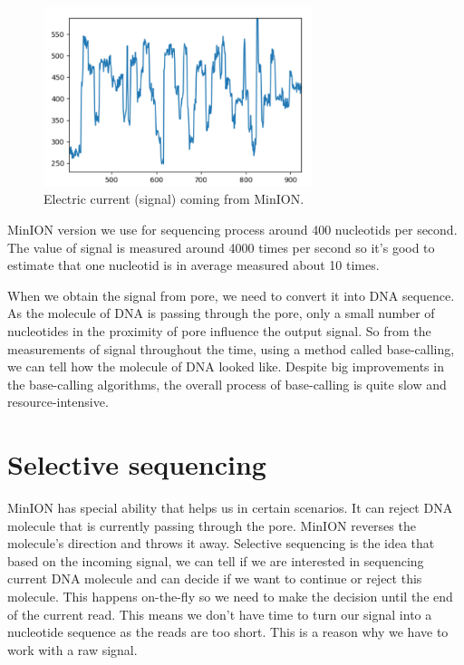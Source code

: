 \begin{figure}
\centerline{\includegraphics[width=0.7\textwidth, height=0.3\textheight]{images/signal}}
\caption[MinION signal]{Electric current (signal) coming from MinION.}
\label{obr:minIonCurrent}
\end{figure}

MinION version we use for sequencing process around 400 nucleotids per second.
The value of signal is measured around 4000 times per second so it's good to estimate
that one nucleotid is in average measured about 10 times.

When we obtain the signal from pore, we need to convert it into DNA
sequence. As the molecule of DNA is passing through the pore, only a small
number of nucleotides in the proximity of pore influence the output signal. So from
the measurements of signal throughout the time, using a method called base-calling,
we can tell how the molecule of DNA looked like. Despite big improvements in the
base-calling algorithms, the overall process of base-calling is quite slow and
resource-intensive.

\section{Selective sequencing}

MinION has special ability that helps us in certain scenarios. It can reject
DNA molecule that is currently passing through the pore. MinION reverses the molecule’s direction and throws it away.
Selective sequencing is the idea that based on the incoming signal, we can tell
if we are interested in sequencing current DNA molecule and can decide if we want
to continue or reject this molecule. This happens on-the-fly so we need to make
the decision until the end of the current read. This means we don't have time to
turn our signal into a nucleotide sequence as the reads are too short. This is
a reason why we have to work with a raw signal.

